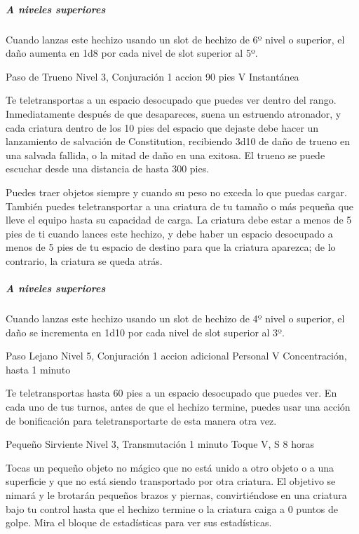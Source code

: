 \documentclass[a4paper,twocolumn,openany,10pt]{dndbook}
\begin{document}
	\subparagraph{A niveles superiores} Cuando lanzas este hechizo usando un slot de hechizo de 6º nivel o superior, el daño
	aumenta en 1d8 por cada nivel de slot superior al 5º. 

\spellheader%
	{Paso de Trueno}
	{Nivel 3, Conjuración}
	{1 accion}
	{90 pies}
	{V}
	{Instantánea}
	
	Te teletransportas a un espacio desocupado que puedes ver dentro del rango. Inmediatamente después de que desapareces, suena
	un estruendo atronador, y cada criatura dentro de los 10 pies del espacio que dejaste debe hacer un lanzamiento de salvación
	de Constitution, recibiendo 3d10 de daño de trueno en una salvada fallida, o la mitad de daño en una exitosa. El trueno se
	puede escuchar desde una distancia de hasta 300 pies.
	
	Puedes traer objetos siempre y cuando su peso no exceda lo que puedas cargar. También puedes teletransportar a una criatura
	de tu tamaño o más pequeña que lleve el equipo hasta su capacidad de carga. La criatura debe estar a menos de 5 pies de ti
	cuando lances este hechizo, y debe haber un espacio desocupado a menos de 5 pies de tu espacio de destino para que la
	criatura aparezca; de lo contrario, la criatura se queda atrás.

	\subparagraph{A niveles superiores} Cuando lanzas este hechizo usando un slot de hechizo de 4º nivel o superior, el daño se
	incrementa en 1d10 por cada nivel de slot superior al 3º. 

\spellheader%
	{Paso Lejano}
	{Nivel 5, Conjuración}
	{1 accion adicional}
	{Personal}
	{V}
	{Concentración, hasta 1 minuto}
	
	Te teletransportas hasta 60 pies a un espacio desocupado que puedes ver. En cada uno de tus turnos, antes de que el hechizo
	termine, puedes usar una acción de bonificación para teletransportarte de esta manera otra vez. 


%
\spellheader%
	{Pequeño Sirviente}
	{Nivel 3, Transmutación}
	{1 minuto}
	{Toque}
	{V, S}
	{8 horas}
	
	Tocas un pequeño objeto no mágico que no está unido a otro objeto o a una superficie y que no está siendo transportado por
	otra criatura. El objetivo se nimará y le brotarán pequeños brazos y piernas, convirtiéndose en una criatura bajo tu control
	hasta que el hechizo termine o la criatura caiga a 0 puntos de golpe. Mira el bloque de estadísticas para ver sus
	estadísticas.
	
\end{document}
